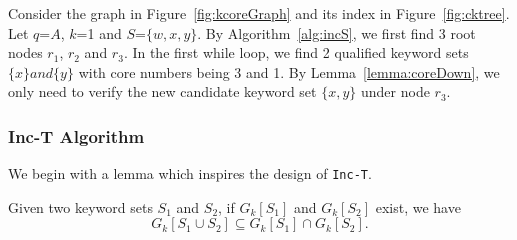 
\begin{example}
\label{eg:inc-S}
Consider the graph in Figure~\ref{fig:kcoreGraph}
and its index in Figure~\ref{fig:cktree}.
Let $q$=$A$, $k$=1 and $S$=$\{w,x,y\}$.
By Algorithm~\ref{alg:incS}, we first find 3 root nodes $r_1$, $r_2$ and $r_3$.
In the first while loop, we find 2 qualified keyword sets $\{x\}and \{y\}$ with core numbers being 3 and 1.
By Lemma~\ref{lemma:coreDown}, we only need to verify the new candidate keyword set $\{x,y\}$ under node $r_3$.
\end{example}

\subsubsection{Inc-T Algorithm}
\label{inc-T}
We begin with a lemma which inspires the design of {\tt Inc-T}.
\begin{lemma}
\label{lemma:kcoreIntersect}
  Given two keyword sets $S_1$ and $S_2$, if $G_k[S_1]$ and $G_k[S_2]$ exist, we have
  \begin{equation}
    G_k[S_1\cup S_2] \subseteq G_k[S_1]\cap G_k[S_2].
  \end{equation}
\end{lemma}

